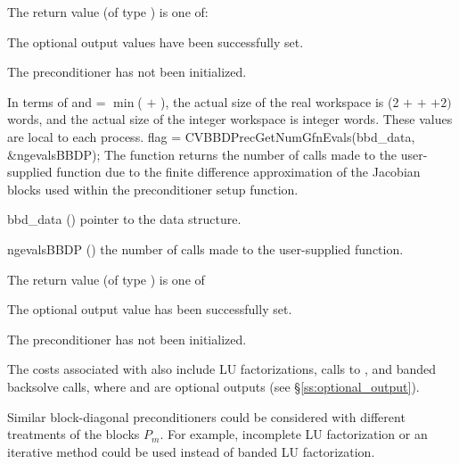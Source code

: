 {
  The return value  (of type ) is one of:
  \begin{args}
  \item[\Id{CV\_SUCCESS}] 
    The optional output values have been successfully set.
  \item[\Id{CV\_PDATA\_NULL}]
    The {\cvbbdpre} preconditioner has not been initialized.
  \end{args}
}
{
  In terms of  and
   = $\min$( $+$ ),
  the actual size of the real workspace is
  (2  $+$  $+$  $+2) \, $
   words, and the actual size of the integer workspace is
   integer words.  These values are local to each process.
}
{
  flag = CVBBDPrecGetNumGfnEvals(bbd\_data, \&ngevalsBBDP);
}
{
  The function  returns the
  number of calls made to the user-supplied  function due to the 
  finite difference approximation of the Jacobian blocks used within
  the preconditioner setup function.
}
{
  \begin{args}[ngevalsBBDP]
  \item[bbd\_data] ()
    pointer to the {\cvbbdpre} data structure.
  \item[ngevalsBBDP] ()
    the number of calls made to the user-supplied  function.
  \end{args}
}
{
  The return value  (of type ) is one of
  \begin{args}
  \item[\Id{CV\_SUCCESS}] 
    The optional output value has been successfully set.
  \item[\Id{CV\_PDATA\_NULL}]
    The {\cvbbdpre} preconditioner has not been initialized.
  \end{args}
}
{}

The costs associated with {\cvbbdpre} also include  LU
factorizations,  calls to , and  banded
backsolve calls, where  and  are optional {\cvodes}
outputs (see \S\ref{ss:optional_output}).

Similar block-diagonal preconditioners could be considered with different
treatments of the blocks $P_m$. For example, incomplete LU factorization or
an iterative method could be used instead of banded LU factorization.

